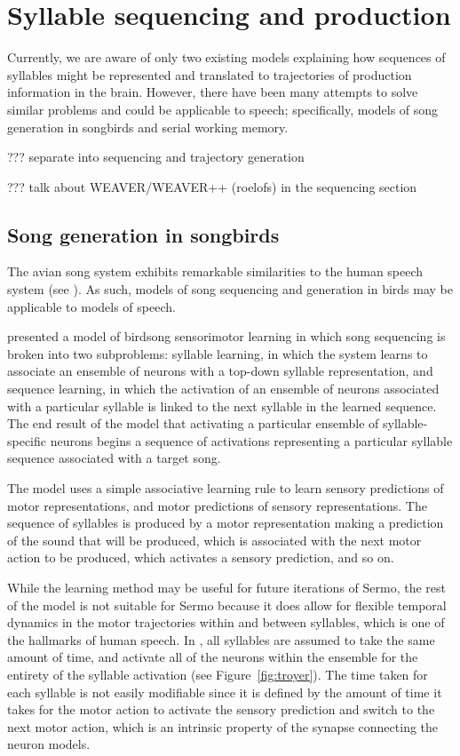 \section{Syllable sequencing and production}

Currently,
we are aware of only two existing models
explaining how sequences of syllables
might be represented
and translated to trajectories of
production information in the brain.
However, there have been many attempts
to solve similar problems
and could be applicable to speech;
specifically,
models of song generation in songbirds
and serial working memory.

??? separate into sequencing and trajectory generation

??? talk about WEAVER/WEAVER++ (roelofs)
in the sequencing section

\subsection{Song generation in songbirds}

The avian song system
exhibits remarkable similarities
to the human speech system
(see \citealt{bolhuis2010}).
As such, models of song sequencing
and generation in birds
may be applicable to models of speech.

\citet{troyer2000} presented a model
of birdsong sensorimotor learning
in which song sequencing is broken
into two subproblems:
syllable learning,
in which the system learns
to associate an ensemble of neurons
with a top-down syllable representation,
and sequence learning,
in which the activation
of an ensemble of neurons
associated with a particular syllable
is linked to the next syllable
in the learned sequence.
The end result of the model
that activating a particular
ensemble of syllable-specific neurons
begins a sequence of activations
representing a particular syllable sequence
associated with a target song.

The model uses a
simple associative learning rule
to learn sensory predictions
of motor representations,
and motor predictions
of sensory representations.
The sequence of syllables is produced
by a motor representation
making a prediction of the
sound that will be produced,
which is associated with
the next motor action to be produced,
which activates a sensory prediction,
and so on.


While the learning method
may be useful for future iterations of Sermo,
the rest of the model is not suitable for Sermo
because it does allow for
flexible temporal dynamics
in the motor trajectories within and between syllables,
which is one of the hallmarks of human speech.
In \citet{troyer2000},
all syllables are assumed
to take the same amount of time,
and activate all of the neurons
within the ensemble for the entirety
of the syllable activation
(see Figure~\ref{fig:troyer}).
The time taken for each syllable
is not easily modifiable since
it is defined by the amount of time
it takes for the motor action
to activate the sensory prediction
and switch to the next motor action,
which is an intrinsic property
of the synapse connecting the neuron models.

